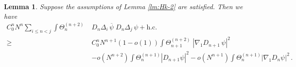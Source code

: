 \documentclass[11pt]{article}
\newtheorem{lemma}[theorem]{Lemma}
\begin{document}
\begin{lemma}\label{lm:Hk-2-1}
Suppose the assumptions of Lemma \ref{lm:Hk-2} are satisfied. Then
we have
\begin{equation}\label{eq:lmHk-2-1}
\begin{split}
C_0^n N^n \sum_{i \leq n < j} \int \Theta^{(n+2)}_n \; &D_n \Delta_i
\, \overline{\psi} \; D_n \Delta_j \, \psi +\text{h.c.}
\\ \geq \; & C_0^n N^{n+1} (1-o(1)) \int \Theta^{(n+2)}_{n+1} \;
|\nabla_1 D_{n+1} \,\psi|^2 \\ &-o (N^{n+2}) \int \Theta^{(n+1)}_{n}
|D_{n+1} \psi|^2 -o (N^{n+1})  \int \Theta^{(n+1)}_n |\nabla_1 D_n
\psi|^2 \, .
\end{split}
\end{equation}
\end{lemma}
\end{document}
